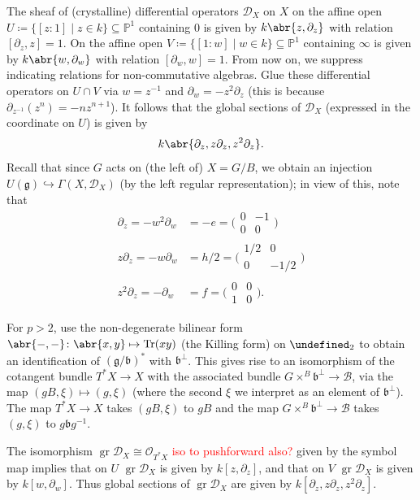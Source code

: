 \documentclass[11pt,leqno]{article}
\newcommand{\sai}[1]{\textcolor{red}{#1}}
\theoremstyle{plain}
\theoremstyle{definition}
\numberwithin{equation}{section}
\numberwithin{lem}{section}
\let\sl\undefined
\DeclareMathOperator{\sl}{\mathfrak{sl}}
\DeclareMathOperator{\gr}{gr}
\begin{document}
The sheaf of (crystalline) differential operators $\mathcal D_X$ on $X$ on the affine open $U \coloneqq \{[z:1]\mid z\in k\}\subseteq \mathbb P^1$ containing $0$ is given by $k\abr{z,\partial_z}$ with relation $[\partial_z,z]=1$. On the affine open $V\coloneqq \{[1:w]\mid w\in k\}\subseteq \mathbb P^1$ containing $\infty$ is given by $k\abr{w,\partial_w}$ with relation $[\partial_w,w]=1$. From now on, we suppress indicating relations for non-commutative algebras. Glue these differential operators on $U\cap V$ via $w = z^{-1}$ and $\partial_w = -z^2\partial_z$ (this is because $\partial_{z^{-1}}(z^n) = -nz^{n+1}$). It follows that the global sections of $\mathcal D_X$ (expressed in the coordinate on $U$) is given by 
\[k\abr{\partial_z, z\partial_z, z^2\partial_z}.\]
Recall that since $G$ acts on (the left of) $X = G/B$, we obtain an injection $U(\mathfrak g)\hookrightarrow \Gamma(X,\mathcal D_X)$ (by the left regular representation); in view of this, note that 
\begin{align*}
    \partial_z = -w^2\partial_w &= -e = \bigl(\!\begin{smallmatrix}
	0 & -1 \\ 0 & 0
\end{smallmatrix}\!\bigr)\\
    z\partial_z = -w\partial_w &= h/2 = \bigl(\!\begin{smallmatrix}
	1/2 & 0 \\ 0 & -1/2
\end{smallmatrix}\!\bigr)\\
z^2\partial_z = -\partial_w &= f = \bigl(\!\begin{smallmatrix}
	0 & 0 \\ 1 & 0
\end{smallmatrix}\!\bigr).
\end{align*}

For $p>2$, use the non-degenerate bilinear form $\abr{-,-}\colon \abr{x,y}\mapsto \Tr(xy)$ (the Killing form) on $\sl_2$ to obtain an identification of $(\mathfrak g/\mathfrak b)^\ast$ with $\mathfrak b^\perp$. This gives rise to an isomorphism of the cotangent bundle $T^\ast X\to X$ with the associated bundle $G\times^B\mathfrak b^\perp\to \mathcal B$, via the map $(gB, \xi)\mapsto (g, \xi)$ (where the second $\xi$ we interpret as an element of $\mathfrak b^\perp$). The map $T^\ast X\to X$ takes $(gB,\xi)$ to $gB$ and the map $G\times^B\mathfrak b^\perp\to \mathcal B$ takes $(g,\xi)$ to $g\mathfrak b g^{-1}$.

The isomorphism $\gr\mathcal D_X\cong \mathcal O_{T^\ast X}$ \sai{iso to pushforward also?} given by the symbol map implies that on $U$ $\gr\mathcal D_X$ is given by $k[z,\partial_z]$, and that on $V$ $\gr\mathcal D_X$ is given by $k[w,\partial_w]$. Thus global sections of $\gr\mathcal D_X$ are given by $k[\partial_z, z\partial_z, z^2\partial_z]$.
\end{document}
